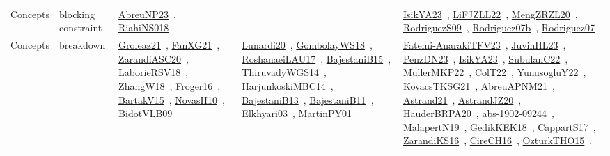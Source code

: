 {\begin{longtable}{lp{3cm}>{\raggedright\arraybackslash}p{6cm}>{\raggedright\arraybackslash}p{6cm}>{\raggedright\arraybackslash}p{8cm}}
Concepts & blocking constraint & \href{../works/AbreuNP23.pdf}{AbreuNP23}~\cite{AbreuNP23}, \href{../works/RiahiNS018.pdf}{RiahiNS018}~\cite{RiahiNS018} &  & \href{../works/IsikYA23.pdf}{IsikYA23}~\cite{IsikYA23}, \href{../works/LiFJZLL22.pdf}{LiFJZLL22}~\cite{LiFJZLL22}, \href{../works/MengZRZL20.pdf}{MengZRZL20}~\cite{MengZRZL20}, \href{../works/RodriguezS09.pdf}{RodriguezS09}~\cite{RodriguezS09}, \href{../works/Rodriguez07b.pdf}{Rodriguez07b}~\cite{Rodriguez07b}, \href{../works/Rodriguez07.pdf}{Rodriguez07}~\cite{Rodriguez07}\\
Concepts & breakdown & \href{../works/Groleaz21.pdf}{Groleaz21}~\cite{Groleaz21}, \href{../works/FanXG21.pdf}{FanXG21}~\cite{FanXG21}, \href{../works/ZarandiASC20.pdf}{ZarandiASC20}~\cite{ZarandiASC20}, \href{../works/LaborieRSV18.pdf}{LaborieRSV18}~\cite{LaborieRSV18}, \href{../works/ZhangW18.pdf}{ZhangW18}~\cite{ZhangW18}, \href{../works/Froger16.pdf}{Froger16}~\cite{Froger16}, \href{../works/BartakV15.pdf}{BartakV15}~\cite{BartakV15}, \href{../works/NovasH10.pdf}{NovasH10}~\cite{NovasH10}, \href{../works/BidotVLB09.pdf}{BidotVLB09}~\cite{BidotVLB09} & \href{../works/Lunardi20.pdf}{Lunardi20}~\cite{Lunardi20}, \href{../works/GombolayWS18.pdf}{GombolayWS18}~\cite{GombolayWS18}, \href{../works/RoshanaeiLAU17.pdf}{RoshanaeiLAU17}~\cite{RoshanaeiLAU17}, \href{../works/BajestaniB15.pdf}{BajestaniB15}~\cite{BajestaniB15}, \href{../works/ThiruvadyWGS14.pdf}{ThiruvadyWGS14}~\cite{ThiruvadyWGS14}, \href{../works/HarjunkoskiMBC14.pdf}{HarjunkoskiMBC14}~\cite{HarjunkoskiMBC14}, \href{../works/BajestaniB13.pdf}{BajestaniB13}~\cite{BajestaniB13}, \href{../works/BajestaniB11.pdf}{BajestaniB11}~\cite{BajestaniB11}, \href{../works/Elkhyari03.pdf}{Elkhyari03}~\cite{Elkhyari03}, \href{../works/MartinPY01.pdf}{MartinPY01}~\cite{MartinPY01} & \href{../works/Fatemi-AnarakiTFV23.pdf}{Fatemi-AnarakiTFV23}~\cite{Fatemi-AnarakiTFV23}, \href{../works/JuvinHL23.pdf}{JuvinHL23}~\cite{JuvinHL23}, \href{../works/PenzDN23.pdf}{PenzDN23}~\cite{PenzDN23}, \href{../works/IsikYA23.pdf}{IsikYA23}~\cite{IsikYA23}, \href{../works/SubulanC22.pdf}{SubulanC22}~\cite{SubulanC22}, \href{../works/MullerMKP22.pdf}{MullerMKP22}~\cite{MullerMKP22}, \href{../works/ColT22.pdf}{ColT22}~\cite{ColT22}, \href{../works/YunusogluY22.pdf}{YunusogluY22}~\cite{YunusogluY22}, \href{../works/KovacsTKSG21.pdf}{KovacsTKSG21}~\cite{KovacsTKSG21}, \href{../works/AbreuAPNM21.pdf}{AbreuAPNM21}~\cite{AbreuAPNM21}, \href{../works/Astrand21.pdf}{Astrand21}~\cite{Astrand21}, \href{../works/AstrandJZ20.pdf}{AstrandJZ20}~\cite{AstrandJZ20}, \href{../works/HauderBRPA20.pdf}{HauderBRPA20}~\cite{HauderBRPA20}, \href{../works/abs-1902-09244.pdf}{abs-1902-09244}~\cite{abs-1902-09244}, \href{../works/MalapertN19.pdf}{MalapertN19}~\cite{MalapertN19}, \href{../works/GedikKEK18.pdf}{GedikKEK18}~\cite{GedikKEK18}, \href{../works/CappartS17.pdf}{CappartS17}~\cite{CappartS17}, \href{../works/ZarandiKS16.pdf}{ZarandiKS16}~\cite{ZarandiKS16}, \href{../works/CireCH16.pdf}{CireCH16}~\cite{CireCH16}, \href{../works/OzturkTHO15.pdf}{OzturkTHO15}~\cite{OzturkTHO15}, 
\end{longtable}}
